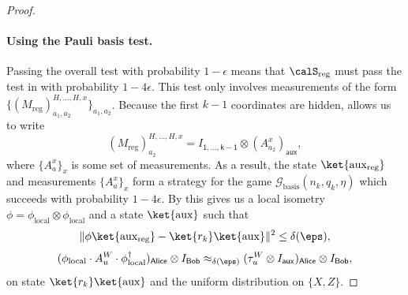 \documentclass[11pt]{article}
\newcommand{\hideq}{H}
\newcommand{\game}{\mathscr{G}}
\newcommand{\reg}[1]{{\mathsf{#1}}}
\begin{document}
\begin{proof}
\paragraph{Using the Pauli basis test.}
Passing the overall test with probability $1-\epsilon$
means that $\calS_{\mathrm{reg}}$ must pass the test in  with probability $1-4\epsilon$.
This test only involves measurements of the form $\{(M_{\mathrm{reg}})^{\hideq,\ldots, \hideq, x}_{a_1, a_2}\}_{a_1, a_2}$.
Because the first $k-1$ coordinates are hidden,  allows us to write
\begin{equation*}
(M_{\mathrm{reg}})^{\hideq, \ldots, \hideq, x}_{a_2} = I_{\reg{1, \ldots, k-1}} \otimes (A^x_{a_2})_{\reg{aux}},
\end{equation*}
where $\{A^x_a\}_x$ is some set of measurements.
As a result, the state $\ket{\mathrm{aux}_{\mathrm{reg}}}$ and measurements $\{A^x_a\}_x$ form a strategy 
for the game $\game_{\mathrm{basis}}(n_k, q_k, \eta)$ which succeeds with probability $1-4\epsilon$.
By  this gives us a local isometry
$\phi = \phi_{\mathrm{local}}\otimes \phi_{\mathrm{local}}$ and a state $\ket{\mathrm{aux}}$ such that
\begin{equation}\label{eq:applied-that-fact}
\Vert \phi \ket{\mathrm{aux}_{\mathrm{reg}}} - \ket{r_k} \ket{\mathrm{aux}} \Vert^2 \leq \delta(\eps),
\end{equation}
\begin{equation}\label{eq:applied-that-fact-dos}
(\phi_{\mathrm{local}}\cdot A_{u}^{W} \cdot \phi_{\mathrm{local}}^\dagger)_{\reg{Alice}}\otimes I_{\reg{Bob}}
\approx_{\delta(\eps)}
(\tau_{u}^{W} \otimes I_{\reg{aux}})_{\reg{Alice}} \otimes I_{\reg{Bob}},
\end{equation}
on state $\ket{r_k} \ket{\mathrm{aux}}$ and the uniform distribution on $\{X,Z\}$.


\end{proof}
\end{document}
